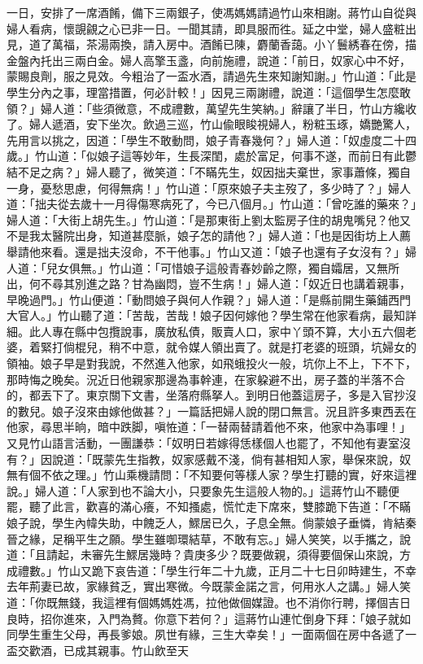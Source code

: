 一日，安排了一席酒餚，備下三兩銀子，使馮媽媽請過竹山來相謝。蔣竹山自從與婦人看病，懷覬覦之心已非一日。一聞其請，即具服而徃。延之中堂，婦人盛粧出見，道了萬福，茶湯兩換，請入房中。酒餚已陳，麝蘭香藹。小丫鬟綉春在傍，描金盤內托出三兩白金。婦人高擎玉盞，向前施禮，說道：「前日，奴家心中不好，蒙賜良劑，服之見效。今粗治了一盃水酒，請過先生來知謝知謝。」竹山道：「此是學生分內之事，理當措置，何必計較！」因見三兩謝禮，說道：「這個學生怎麼敢領？」婦人道：「些須微意，不成禮數，萬望先生笑納。」辭讓了半日，竹山方纔收了。婦人遞酒，安下坐次。飲過三巡，竹山偸眼睃視婦人，粉粧玉琢，嬌艷驚人，先用言以挑之，因道：「學生不敢動問，娘子青春幾何？」婦人道：「奴虛度二十四歲。」竹山道：「似娘子這等妙年，生長深閨，處於富足，何事不遂，而前日有此鬱結不足之病？」{}婦人聽了，微笑道：「不瞞先生，奴因拙夫棄世，家事蕭條，獨自一身，{}憂愁思慮，何得無病！」竹山道：「原來娘子夫主歿了，多少時了？」婦人道：「拙夫從去歲十一月得傷寒病死了，今已八個月。」竹山道：「曾吃誰的藥來？」{}婦人道：「大街上胡先生。」竹山道：「是那東街上劉太監房子住的胡鬼嘴兒？他又不是我太醫院出身，知道甚麼脈，娘子怎的請他？」婦人道：「也是因街坊上人薦舉請他來看。還是拙夫沒命，不干他事。」竹山又道：「娘子也還有子女沒有？」婦人道：「兒女俱無。」竹山道：「可惜娘子這般青春妙齡之際，獨自孀居，又無所出，何不尋其別進之路？甘為幽悶，豈不生病！」{}婦人道：「奴近日也講着親事，早晚過門。」竹山便道：「動問娘子與何人作親？」婦人道：「是縣前開生藥鋪西門大官人。」竹山聽了道：「苦哉，苦哉！娘子因何嫁他？學生常在他家看病，最知詳細。此人專在縣中包攬說事，廣放私債，販賣人口，家中丫頭不算，大小五六個老婆，着緊打倘棍兒，稍不中意，就令媒人領出賣了。就是打老婆的班頭，坑婦女的領袖。娘子早是對我說，不然進入他家，如飛蛾投火一般，坑你上不上，下不下，那時悔之晚矣。況近日他親家那邊為事幹連，在家躱避不出，房子蓋的半落不合的，都丟下了。東京關下文書，坐落府縣拏人。到明日他蓋這房子，多是入官抄沒的數兒。娘子沒來由嫁他做甚？」一篇話把婦人說的閉口無言。況且許多東西丟在他家，尋思半晌，暗中跌脚，{}嗔恠道：「一替兩替請着他不來，他家中為事哩！」又見竹山語言活動，一團謙恭：「奴明日若嫁得恁樣個人也罷了，{}不知他有妻室沒有？」因說道：「既蒙先生指教，奴家感戴不淺，倘有甚相知人家，舉保來說，奴無有個不依之理。」竹山乘機請問：「不知要何等樣人家？學生打聽的實，好來這裡說。」婦人道：「人家到也不論大小，只要象先生這般人物的。」這蔣竹山不聽便罷，聽了此言，歡喜的滿心癢，不知搔處，慌忙走下席來，雙膝跪下告道：「不瞞娘子說，學生內幃失助，中餽乏人，鰥居已久，子息全無。倘蒙娘子垂憐，肯結秦晉之緣，足稱平生之願。學生雖啣環結草，不敢有忘。」{}婦人笑笑，以手攜之，說道：「且請起，未審先生鰥居幾時？貴庚多少？既要做親，須得要個保山來說，方成禮數。」竹山又跪下哀告道：「學生行年二十九歲，正月二十七日卯時建生，不幸去年荊妻已故，家緣貧乏，實出寒微。今既蒙金諾之言，何用氷人之講。」婦人笑道：「你既無錢，我這裡有個媽媽姓馮，拉他做個媒證。也不消你行聘，擇個吉日良時，招你進來，入門為贅。你意下若何？」這蔣竹山連忙倒身下拜：「娘子就如同學生重生父母，再長爹娘。夙世有緣，三生大幸矣！」一面兩個在房中各遞了一盃交歡酒，已成其親事。竹山飲至天